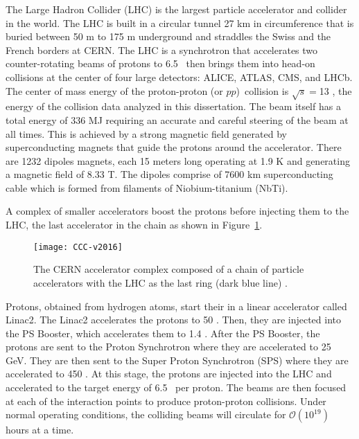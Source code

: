 The Large Hadron Collider (LHC) is the largest 
particle accelerator and collider in the world.
The LHC is built in a circular tunnel 27 km in circumference 
that is buried between 50 m to 175 m underground 
and straddles the Swiss and the French borders 
at CERN.
The LHC is a synchrotron that accelerates two counter-rotating beams of
protons  to 6.5 \TeV~then brings them into head-on collisions at the center of 
four large detectors: ALICE, ATLAS, CMS, and LHCb. The center of mass energy of the proton-proton (or $pp$)\
collision is $\sqrt{s}=$13 \TeV, the energy of the collision data analyzed in this dissertation.
The beam itself has a total energy of 336 MJ requiring an accurate and careful steering 
of the beam at all times.
This is achieved by a strong magnetic field generated by 
superconducting magnets that guide the protons around the accelerator.
There are 1232 dipoles magnets, each 15 meters long operating at 1.9 K and generating a magnetic field of 8.33 T.
The dipoles comprise of 7600 km superconducting cable which is formed from filaments of Niobium-titanium (NbTi).

A complex of smaller accelerators boost the protons before
injecting them to the LHC, the last accelerator in the chain as shown in 
Figure~\ref{fig:exp.lhc.CCC}.
\begin{figure}[!htb]
\centering
\texttt{[image: CCC-v2016]}
\caption{The CERN accelerator complex 
composed of a chain of  particle accelerators with
the LHC as the last ring (dark blue line) \cite{DeMelis:2197559}.
}
\label{fig:exp.lhc.CCC}
\end{figure} 
Protons, obtained from hydrogen atoms, start their in a linear accelerator
called Linac2. The Linac2 accelerates the protons to 50 \MeV. Then, they are injected into
the PS Booster, which accelerates them to 1.4 \GeV. After the PS Booster, the protons are sent to
the Proton Synchrotron where they are accelerated to 25 GeV. They are then sent to the Super
Proton Synchrotron (SPS) where they are accelerated to 450 \GeV. 
At this stage, the protons are injected into the LHC and accelerated to the target 
energy of 6.5 \TeV~per proton.
 The beams are then focused at each of the interaction points to produce proton-proton collisions.
Under normal operating conditions, the colliding beams will circulate for $\mathcal{O}\left(10^{19}\right)$ hours at a time.

